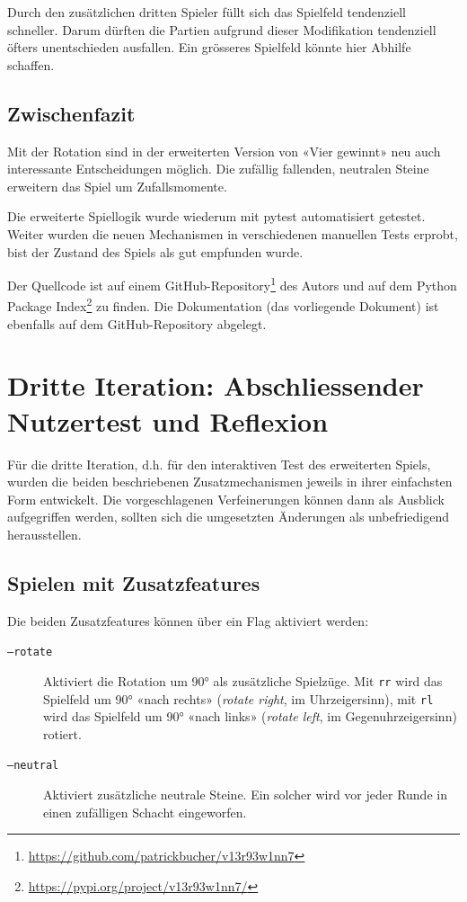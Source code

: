 \documentclass[a4paper,11pt,hidelinks]{scrartcl}
\begin{document}
Durch den zusätzlichen dritten Spieler füllt sich das Spielfeld tendenziell schneller. Darum dürften die Partien aufgrund dieser Modifikation tendenziell öfters unentschieden ausfallen. Ein grösseres Spielfeld könnte hier Abhilfe schaffen.

\subsection{Zwischenfazit}

Mit der Rotation sind in der erweiterten Version von «Vier gewinnt» neu auch interessante Entscheidungen möglich. Die zufällig fallenden, neutralen Steine erweitern das Spiel um Zufallsmomente.

Die erweiterte Spiellogik wurde wiederum mit pytest automatisiert getestet. Weiter wurden die neuen Mechanismen in verschiedenen manuellen Tests erprobt, bist der Zustand des Spiels als gut empfunden wurde.

Der Quellcode ist auf einem GitHub-Repository\footnote{\url{https://github.com/patrickbucher/v13r93w1nn7}} des Autors und auf dem Python Package Index\footnote{\url{https://pypi.org/project/v13r93w1nn7/}} zu finden. Die Dokumentation (das vorliegende Dokument) ist ebenfalls auf dem GitHub-Repository abgelegt.

\clearpage

\section{Dritte Iteration: Abschliessender Nutzertest und Reflexion}

Für die dritte Iteration, d.h. für den interaktiven Test des erweiterten Spiels, wurden die beiden beschriebenen Zusatzmechanismen jeweils in ihrer einfachsten Form entwickelt. Die vorgeschlagenen Verfeinerungen können dann als Ausblick aufgegriffen werden, sollten sich die umgesetzten Änderungen als unbefriedigend herausstellen.

\subsection{Spielen mit Zusatzfeatures}

Die beiden Zusatzfeatures können über ein Flag aktiviert werden:

\begin{description}
    \item[\texttt{--rotate}] Aktiviert die Rotation um 90° als zusätzliche Spielzüge. Mit \texttt{rr} wird das Spielfeld um 90° «nach rechts» (\textit{rotate right}, im Uhrzeigersinn), mit \texttt{rl} wird das Spielfeld um 90° «nach links» (\textit{rotate left}, im Gegenuhrzeigersinn) rotiert.
    \item[\texttt{--neutral}] Aktiviert zusätzliche neutrale Steine. Ein solcher wird vor jeder Runde in einen zufälligen Schacht eingeworfen.
\end{description}
\end{document}
